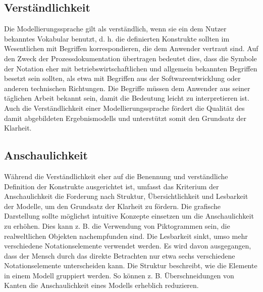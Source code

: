 \subsection{Verständlichkeit}
Die Modellierungssprache gilt als verständlich, wenn sie ein dem Nutzer bekanntes Vokabular benutzt, d. h. die definierten Konstrukte sollten im Wesentlichen mit Begriffen korrespondieren, die dem Anwender vertraut sind. Auf den Zweck der Prozessdokumentation übertragen bedeutet dies, dass die Symbole der Notation eher mit betriebswirtschaftlichen und allgemein bekannten Begriffen besetzt sein sollten, als etwa mit Begriffen aus der Softwareentwicklung oder anderen technischen Richtungen. Die Begriffe müssen dem Anwender aus seiner täglichen Arbeit bekannt sein, damit die Bedeutung leicht zu interpretieren ist. Auch die Verständlichkeit einer Modellierungssprache fördert die Qualität des damit abgebildeten Ergebnismodells und unterstützt somit den Grundsatz der Klarheit.

\subsection{Anschaulichkeit}
Während die Verständlichkeit eher auf die Benennung und verständliche Definition der Konstrukte ausgerichtet ist, umfasst das Kriterium der Anschaulichkeit die Forderung nach Struktur, Übersichtlichkeit und Lesbarkeit der Modelle, um den Grundsatz der Klarheit zu fördern. Die grafische Darstellung sollte möglichst intuitive Konzepte einsetzen um die Anschaulichkeit zu erhöhen. Dies kann z. B. die Verwendung von Piktogrammen sein, die realweltlichen Objekten nachempfunden sind. Die Lesbarkeit sinkt, umso mehr verschiedene Notationselemente verwendet werden. Es wird davon ausgegangen, dass der Mensch durch das direkte Betrachten nur etwa sechs verschiedene Notationselemente unterscheiden kann. Die Struktur beschreibt, wie die Elemente in einem Modell gruppiert werden. So können z. B. Überschneidungen von Kanten die Anschaulichkeit eines Modells erheblich reduzieren.


